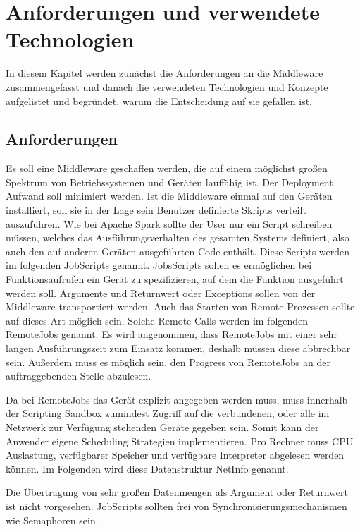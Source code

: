 
\chapter{Anforderungen und verwendete Technologien}
In diesem Kapitel werden zunächst die Anforderungen an die Middleware zusammengefasst und danach die verwendeten Technologien und Konzepte aufgelistet und begründet, warum die Entscheidung auf sie gefallen ist.


\section{Anforderungen}
Es soll eine Middleware geschaffen werden, die auf einem möglichst großen Spektrum von Betriebssystemen und Geräten lauffähig ist.
Der Deployment Aufwand soll minimiert werden.
Ist die Middleware einmal auf den Geräten installiert, soll sie in der Lage sein Benutzer definierte Skripts verteilt auszuführen.
Wie bei Apache Spark sollte der User nur ein Script schreiben müssen, welches das Ausführungsverhalten des gesamten Systems definiert, also auch den auf anderen Geräten ausgeführten Code enthält.
Diese Scripts werden im folgenden JobScripts genannt.
JobsScripts sollen es ermöglichen bei Funktionsaufrufen ein Gerät zu spezifizieren, auf dem die Funktion ausgeführt werden soll.
Argumente und Returnwert oder Exceptions sollen von der Middleware transportiert werden.
Auch das Starten von Remote Prozessen sollte auf dieses Art möglich sein.
Solche Remote Calls werden im folgenden RemoteJobs genannt.
Es wird angenommen, dass RemoteJobs mit einer sehr langen Ausführungszeit zum Einsatz kommen, deshalb müssen diese abbrechbar sein.
Außerdem muss es möglich sein, den Progress von RemoteJobs an der auftraggebenden Stelle abzulesen.

Da bei RemoteJobs das Gerät explizit angegeben werden muss, muss innerhalb der Scripting Sandbox zumindest Zugriff auf die verbundenen, oder alle im Netzwerk zur Verfügung stehenden Geräte gegeben sein.
Somit kann der Anwender eigene Scheduling Strategien implementieren.
Pro Rechner muss CPU Auslastung, verfügbarer Speicher und verfügbare Interpreter abgelesen werden können.
Im Folgenden wird diese Datenstruktur NetInfo genannt.

Die Übertragung von sehr großen Datenmengen als Argument oder Returnwert ist nicht vorgesehen.
JobScripts sollten frei von Synchronisierungsmechanismen wie Semaphoren sein.




